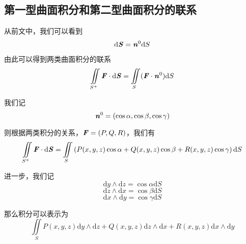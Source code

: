 \documentclass[UTF8,openany]{book}
\begin{document}
	\subsection{第一型曲面积分和第二型曲面积分的联系}
	\par 从前文中，我们可以看到
	$$\mathrm{d}\textbf{\textit{S}}=\textbf{\textit{n}}^0\mathrm{d}S$$
	\par 由此可以得到两类曲面积分的联系
	$$\iint\limits_{S^+}\textbf{\textit{F}}\cdot\mathrm{d}\textbf{\textit{S}}=
	\iint\limits_{S}(\textbf{\textit{F}}\cdot\textbf{\textit{n}}^0)\mathrm{d}S$$
	\par 我们记
	$$\textbf{\textit{n}}^0=(\cos\alpha,\cos\beta,\cos\gamma)$$
	\par 则根据两类积分的关系，$\textbf{\textit{F}}=(P,Q,R)$，我们有
	$$\iint\limits_{S^+}\textbf{\textit{F}}\cdot\mathrm{d}\textbf{\textit{S}}=
	\iint\limits_{S}\left(P(x,y,z)\cos\alpha+Q(x,y,z)\cos\beta+R(x,y,z)\cos\gamma\right)\mathrm{d}S$$
	\par 进一步，我们记
	$$\mathrm{d}y\land\mathrm{d}z=\cos\alpha\mathrm{d}S$$
	$$\mathrm{d}z\land\mathrm{d}x=\cos\beta\mathrm{d}S$$
	$$\mathrm{d}x\land\mathrm{d}y=\cos\gamma\mathrm{d}S$$
	\par 那么积分可以表示为
	$$\iint\limits_{S}P(x,y,z)\mathrm{d}y\land\mathrm{d}z+
	Q(x,y,z)\mathrm{d}z\land\mathrm{d}x+R(x,y,z)\mathrm{d}x\land\mathrm{d}y$$
\end{document}
